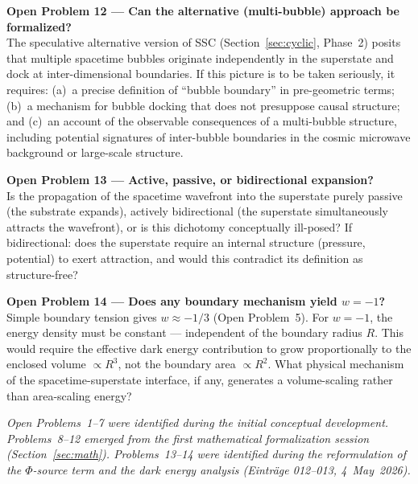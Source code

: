 \documentclass[12pt,a4paper]{article}
\begin{document}
\begin{openbox}
\textbf{Open Problem 12 — Can the alternative (multi-bubble) approach be formalized?}\\
The speculative alternative version of SSC (Section~\ref{sec:cyclic},
Phase~2) posits that multiple spacetime bubbles originate independently
in the superstate and dock at inter-dimensional boundaries.  If this
picture is to be taken seriously, it requires: (a)~a precise definition
of ``bubble boundary'' in pre-geometric terms; (b)~a mechanism for
bubble docking that does not presuppose causal structure; and (c)~an
account of the observable consequences of a multi-bubble structure,
including potential signatures of inter-bubble boundaries in the
cosmic microwave background or large-scale structure.
\end{openbox}

\begin{openbox}
\textbf{Open Problem 13 — Active, passive, or bidirectional expansion?}\\
Is the propagation of the spacetime wavefront into the superstate purely
passive (the substrate expands), actively bidirectional (the superstate
simultaneously attracts the wavefront), or is this dichotomy
conceptually ill-posed?  If bidirectional: does the superstate require
an internal structure (pressure, potential) to exert attraction, and
would this contradict its definition as structure-free?
\end{openbox}

\begin{openbox}
\textbf{Open Problem 14 — Does any boundary mechanism yield $w = -1$?}\\
Simple boundary tension gives $w \approx -1/3$ (Open Problem~5).  For
$w = -1$, the energy density must be constant — independent of the
boundary radius $R$.  This would require the effective dark energy
contribution to grow proportionally to the enclosed volume $\propto
R^3$, not the boundary area $\propto R^2$.  What physical mechanism of
the spacetime-superstate interface, if any, generates a volume-scaling
rather than area-scaling energy?
\end{openbox}

\medskip
\noindent\textit{Open Problems~1--7 were identified during the initial
conceptual development.  Problems~8--12 emerged from the first
mathematical formalization session (Section~\ref{sec:math}).
Problems~13--14 were identified during the reformulation of the
$\Phi$-source term and the dark energy analysis (Einträge 012--013,
4~May~2026).}
\end{document}
